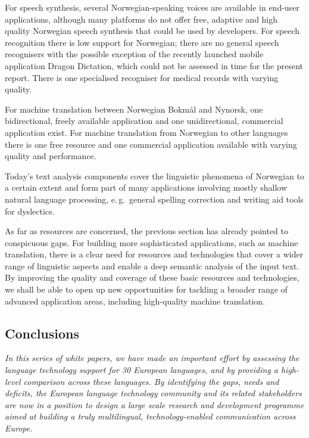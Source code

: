 \begin{multicols}{2}
For speech synthesis, several Norwegian-speaking voices are available in end-user applications, although many platforms do not offer free, adaptive and high quality Norwegian speech synthesis that could be used by developers. 
For speech recognition there is low support for Norwegian; there are no general speech recognisers with the possible exception of the recently launched mobile application Dragon Dictation, which could not be assessed in time for the present report.
There is one specialised recogniser for medical records with varying quality.

For machine translation between Norwegian Bokmål and Nynorsk, one bidirectional, freely available application and one unidirectional, commercial application exist. 
For machine translation from Norwegian to other languages there is one free resource and one commercial application available with varying quality and performance. 

Today’s text analysis components cover the linguistic phenomena of Norwegian to a certain extent and form part of many applications involving mostly shallow natural language processing, e.\,g.~general spelling correction and writing aid tools for dyslectics. 

As far as resources are concerned, the previous section has already pointed to conspicuous gaps.
For building more sophisticated applications, such as machine translation, there is a clear need for resources and technologies that cover a wider range of linguistic aspects and enable a deep semantic analysis of the input text. By improving the quality and coverage of these basic resources and technologies, we shall be able to open up new opportunities for tackling a broader range of advanced application areas, including high-quality machine translation.

\subsection{Conclusions}

\emph{In this series of white papers, we have made an important effort by assessing the language technology support for 30 European languages, and by providing a high-level comparison across these languages. By identifying the gaps, needs and deficits, the European language technology community and its related stakeholders are now in a position to design a large scale research and development programme aimed at building a truly multilingual, technology-enabled communication across Europe.}


\end{multicols}
